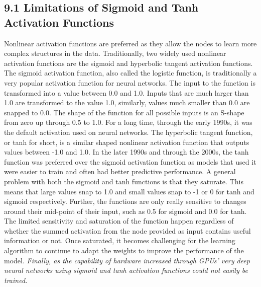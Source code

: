 \documentclass[11pt]{article}
\begin{document}
\subsection{9.1 Limitations of Sigmoid and Tanh Activation Functions}
\hspace*{1cm} Nonlinear activation functions are preferred as they allow the nodes to learn more complex structures in the data. Traditionally, two widely used nonlinear activation functions are the sigmoid and hyperbolic tangent activation functions. The sigmoid activation function, also called the logistic function, is traditionally a very popular activation function for neural networks. The input to the function is transformed into a value between 0.0 and 1.0. Inputs that are much larger than 1.0 are transformed to the value 1.0, similarly, values much smaller than 0.0 are snapped to 0.0. The shape of the function for all possible inputs is an S-shape from zero up through 0.5 to 1.0. For a long time, through the early 1990s, it was the default activation used on neural networks. The hyperbolic tangent function, or tanh for short, is a similar shaped nonlinear activation function that outputs values between -1.0 and 1.0. In the later 1990s and through the 2000s, the tanh function was preferred over the sigmoid activation function as models that used it were easier to train and often had better predictive performance. A general problem with both the sigmoid and tanh functions is that they saturate. This means that large values snap to 1.0 and small values snap to -1 or 0 for tanh and sigmoid respectively. Further, the functions are only really sensitive to changes around their mid-point of their input, such as 0.5 for sigmoid and 0.0 for tanh. The limited sensitivity and saturation of the function happen regardless of whether the summed activation from the node provided as input contains useful information or not. Once saturated, it becomes challenging for the learning algorithm to continue to adapt the weights to improve the performance of the model. \textit{Finally, as the capability of hardware increased through GPUs’ very deep neural networks using sigmoid and tanh activation functions could not easily be trained.}
\end{document}
